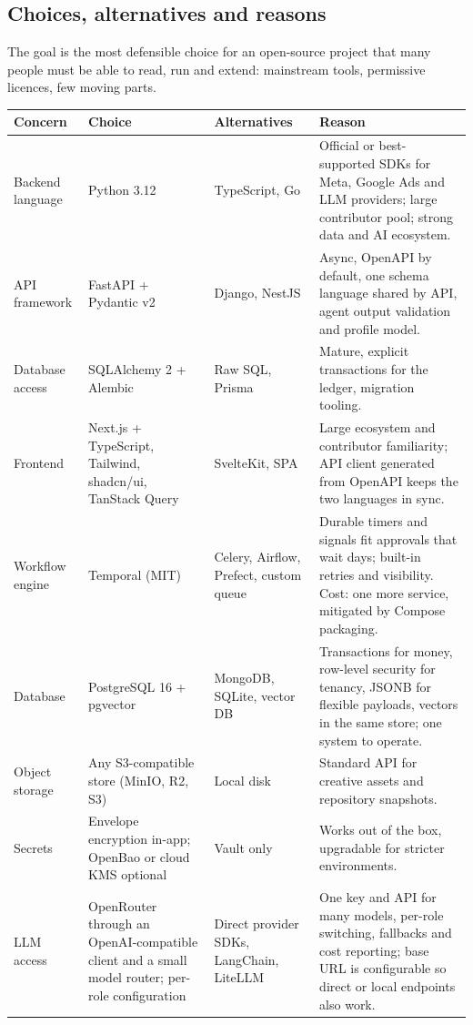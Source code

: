 \documentclass[11pt,a4paper]{article}
\begin{document}
\subsection{Choices, alternatives and reasons}
The goal is the most defensible choice for an open-source project that many people must be able to read, run and extend: mainstream tools, permissive licences, few moving parts.

{\small\begin{longtable}{@{}>{\raggedright\arraybackslash}p{2.3cm}>{\raggedright\arraybackslash}p{3.5cm}>{\raggedright\arraybackslash}p{3.2cm}>{\raggedright\arraybackslash}p{6.3cm}@{}}
\toprule
\textbf{Concern} & \textbf{Choice} & \textbf{Alternatives} & \textbf{Reason}\\
\midrule
\endhead
Backend language & Python 3.12 & TypeScript, Go & Official or best-supported SDKs for Meta, Google Ads and LLM providers; large contributor pool; strong data and AI ecosystem.\\
API framework & FastAPI + Pydantic v2 & Django, NestJS & Async, OpenAPI by default, one schema language shared by API, agent output validation and profile model.\\
Database access & SQLAlchemy 2 + Alembic & Raw SQL, Prisma & Mature, explicit transactions for the ledger, migration tooling.\\
Frontend & Next.js + TypeScript, Tailwind, shadcn/ui, TanStack Query & SvelteKit, SPA & Large ecosystem and contributor familiarity; API client generated from OpenAPI keeps the two languages in sync.\\
Workflow engine & Temporal (MIT) & Celery, Airflow, Prefect, custom queue & Durable timers and signals fit approvals that wait days; built-in retries and visibility. Cost: one more service, mitigated by Compose packaging.\\
Database & PostgreSQL 16 + pgvector & MongoDB, SQLite, vector DB & Transactions for money, row-level security for tenancy, JSONB for flexible payloads, vectors in the same store; one system to operate.\\
Object storage & Any S3-compatible store (MinIO, R2, S3) & Local disk & Standard API for creative assets and repository snapshots.\\
Secrets & Envelope encryption in-app; OpenBao or cloud KMS optional & Vault only & Works out of the box, upgradable for stricter environments.\\
LLM access & OpenRouter through an OpenAI-compatible client and a small model router; per-role configuration & Direct provider SDKs, LangChain, LiteLLM & One key and API for many models, per-role switching, fallbacks and cost reporting; base URL is configurable so direct or local endpoints also work.\\

\end{longtable}}
\end{document}
